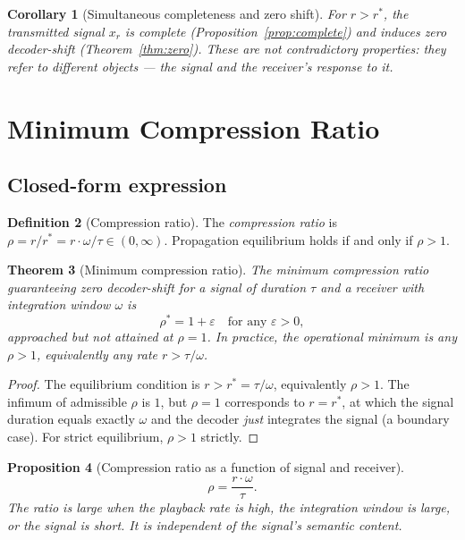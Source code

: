 \documentclass[twocolumn,11pt,a4paper]{article}
\theoremstyle{main}
\newtheorem{theorem}{Theorem}[section]
\newtheorem{proposition}[theorem]{Proposition}
\newtheorem{corollary}[theorem]{Corollary}
\theoremstyle{definition}
\newtheorem{definition}[theorem]{Definition}
\theoremstyle{remark}
\newcommand{\rate}{r}
\newcommand{\window}{\omega}
\begin{document}
\begin{corollary}[Simultaneous completeness and zero shift]
\label{cor:simultaneous}
For $\rate > \rate^*$, the transmitted signal $x_\rate$ is complete
(Proposition~\ref{prop:complete}) and induces zero decoder-shift
(Theorem~\ref{thm:zero}). These are not contradictory properties: they
refer to different objects --- the signal and the receiver's response to
it.
\end{corollary}

\section{Minimum Compression Ratio}
\label{sec:minimum}

\subsection{Closed-form expression}

\begin{definition}[Compression ratio]
\label{def:ratio}
The \emph{compression ratio} is $\rho = \rate / \rate^* = \rate \cdot
\window / \tau \in (0, \infty)$. Propagation equilibrium holds if and
only if $\rho > 1$.
\end{definition}

\begin{theorem}[Minimum compression ratio]
\label{thm:minratio}
The minimum compression ratio guaranteeing zero decoder-shift for a
signal of duration $\tau$ and a receiver with integration window
$\window$ is
\[
  \rho^* = 1 + \varepsilon \quad \text{for any } \varepsilon > 0,
\]
approached but not attained at $\rho = 1$. In practice, the operational
minimum is any $\rho > 1$, equivalently any rate $\rate > \tau /
\window$.
\end{theorem}

\begin{proof}
The equilibrium condition is $\rate > \rate^* = \tau/\window$,
equivalently $\rho > 1$. The infimum of admissible $\rho$ is $1$, but
$\rho = 1$ corresponds to $\rate = \rate^*$, at which the signal duration
equals exactly $\window$ and the decoder \emph{just} integrates the
signal (a boundary case). For strict equilibrium, $\rho > 1$ strictly.
\end{proof}

\begin{proposition}[Compression ratio as a function of signal and receiver]
\label{prop:ratio}
\[
  \rho = \frac{\rate \cdot \window}{\tau}.
\]
The ratio is large when the playback rate is high, the integration window
is large, or the signal is short. It is independent of the signal's
semantic content.
\end{proposition}
\end{document}
